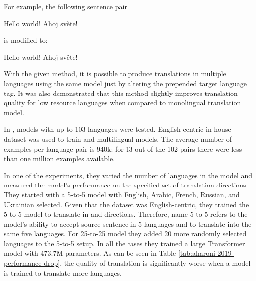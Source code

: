 For example, the following  sentence pair:
\begin{displayquote}
Hello world! \to{} Ahoj světe!
\end{displayquote}
is modified to:
\begin{displayquote}
 Hello world! \to{} Ahoj světe!
\end{displayquote}

With the given method, it is possible to produce translations in multiple
languages using the same model just by altering the prepended target language tag.
It was also demonstrated that this method slightly improves translation quality for 
low resource languages when compared to monolingual translation model.

In \cite{aharoni-etal-2019-massively}, models with up to 103 languages were tested.
English centric in-house dataset was used to train  and
 multilingual models.
The average number of examples per language pair is 940k:
for 13 out of the 102 pairs there were less than one million examples available.

In one of the experiments, they varied the number of languages in the model and measured
the model's performance on the specified set of translation directions.
They started with a 5-to-5 model with English, Arabic, French, Russian, and Ukrainian selected.
Given that the dataset was English-centric, they trained the 5-to-5 model to translate
in  and  directions.
Therefore, name 5-to-5 refers to the model's ability to accept source sentence in 5 languages
and to translate into the same five languages.
For 25-to-25 model they added 20 more randomly selected languages to the 5-to-5 setup.
In all the cases they trained a large Transformer model with 473.7M parameters.
As can be seen in Table \ref{tab:aharoni-2019-performance-drop}, the quality of translation
is significantly worse when a model is trained to translate more languages.


